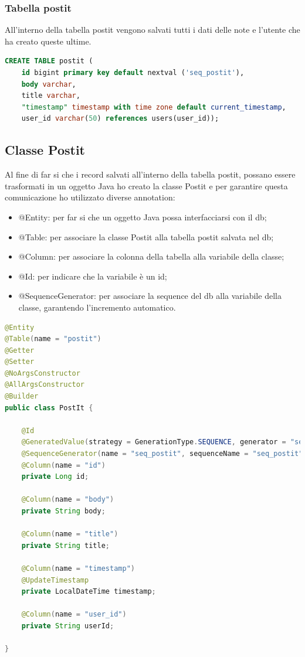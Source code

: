 \subsubsection{Tabella postit}
All'interno della tabella postit vengono salvati tutti i dati delle note e l'utente che ha creato queste ultime.
\begin{lstlisting}[language=sql,basicstyle=\small, caption={Creazione tabella postit}, captionpos=b]
CREATE TABLE postit (
    id bigint primary key default nextval ('seq_postit'),
    body varchar,
    title varchar,
    "timestamp" timestamp with time zone default current_timestamp,
    user_id varchar(50) references users(user_id));
\end{lstlisting}

\subsection{Classe Postit}
Al fine di far si che i record salvati all'interno della tabella postit, possano essere trasformati in un oggetto Java ho creato la classe Postit e per garantire questa comunicazione ho utilizzato diverse annotation:
\begin{itemize}
    \item @Entity: per far si che un oggetto Java possa interfacciarsi con il db;
    \item @Table: per associare la classe Postit alla tabella postit salvata nel db;
    \item @Column: per associare la colonna della tabella alla variabile della classe;
    \item @Id: per indicare che la variabile è un id;
    \item @SequenceGenerator: per associare la sequence del db alla variabile della classe, garantendo l'incremento automatico.
\end{itemize}
\begin{lstlisting}[language=Java,basicstyle=\tiny, caption={Classe PostIt.java}, captionpos=b]
@Entity
@Table(name = "postit")
@Getter
@Setter
@NoArgsConstructor
@AllArgsConstructor
@Builder
public class PostIt {

    @Id
    @GeneratedValue(strategy = GenerationType.SEQUENCE, generator = "seq_postit")
    @SequenceGenerator(name = "seq_postit", sequenceName = "seq_postit", allocationSize = 1)
    @Column(name = "id")
    private Long id;

    @Column(name = "body")
    private String body;

    @Column(name = "title")
    private String title;

    @Column(name = "timestamp")
    @UpdateTimestamp
    private LocalDateTime timestamp;

    @Column(name = "user_id")
    private String userId;

}

\end{lstlisting}
\newpage
